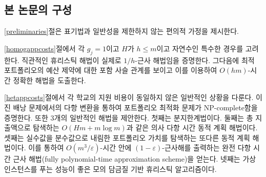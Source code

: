 \documentclass[11pt]{article} %
\newif\ifen
\theoremstyle{definition}
\theoremstyle{definition}
\begin{document}
\ifen \subsection{Structure of this paper} \else \subsection{본 논문의 구성}\fi
\ifen Section \ref{preliminaries} introduces some additional notation and assumptions that can be imposed without loss of generality. 
\else \ref{preliminaries}절은 표기법과 일반성을 제한하지 않는 편의적 가정을 제시한다.\fi

\ifen
In Section \ref{homogappcosts}, we consider the special case where each $g_j = 1$ and $H$ is an integer $h \leq m$.  We show that an intuitive heuristic is in fact a $1/h$-approximation algorithm. Then, we show that the optimal portfolios are nested in the budget constraint, which yields an exact algorithm that runs in $O(hm)$-time.
\else
\ref{homogappcosts}절에서 각 $g_j = 1$이고 $H$가 $h \leq m$이고 자연수인 특수한 경우를 고려한다. 직관적인 휴리스틱 해법이 실제로 $1/h$-근사 해법임을 증명한다. 그다음에 최적 포트폴리오의 예산 제약에 대한 포함 사슬 관계를 보이고 이를 이용하여 $O(hm)$-시간 정확한 해법을 도출한다.
\fi

\ifen
In Section \ref{hetappcosts}, we turn to the scenario in which colleges differ in their application fees. We show that the decision form of the portfolio optimization problem is NP-complete through a polynomial reduction from the binary knapsack problem. We provide four algorithms for this more general setup. The first is a branch-and-bound routine. The second is a dynamic program that iterates on total expenditures and produces an exact solution in pseudopolynomial time, namely $O(Hm + m \log m)$. The third is a different dynamic program that iterates on truncated portfolio valuations. It yields a fully polynomial-time approximation scheme that produces a $(1 - \varepsilon)$-optimal solution in $O(m^3 / \varepsilon)$ time.  The fourth is a simulated-annealing heuristic algorithm that demonstrates strong performance in our synthetic instances. 
\else
\ref{hetappcosts}절에서 각 학교의 지원 비용이 동일하지 않은 일반적인 상황을 다룬다. 이진 배낭 문제에서의 다항 변환을 통하여 포트폴리오 최적화 문제가 NP-complete함을 증명한다. 또한 3개의 일반적인 해법을 제안한다. 첫째는 분지한계법이다. 둘째는 총 지출액으로 탐색하는 $O(Hm + m \log m)$과 같은 의사 다항 시간 동적 계획 해법이다. 셋째는 실수값을 분수값으로 내림한 포트폴리오 가치를 탐색하는 또다른 동적 계획 해법이다. 이를 통하여 $O(m^3 / \varepsilon)$-시간 안에 $(1 - \varepsilon)$-근사해를 출력하는 완전 다항 시간 근사 해법(fully polynomial-time approximation scheme)을 얻는다. 넷째는 가상 인스턴스를 푸는 성능이 좋은 모의 담금질 기반 휴리스틱 알고리즘이다.
\fi
\end{document}
